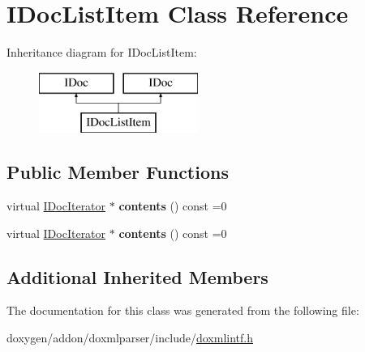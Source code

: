 \hypertarget{class_i_doc_list_item}{}\section{I\+Doc\+List\+Item Class Reference}
\label{class_i_doc_list_item}
Inheritance diagram for I\+Doc\+List\+Item\+:\begin{figure}[H]
\begin{center}
\leavevmode
\includegraphics[height=2.000000cm]{class_i_doc_list_item}
\end{center}
\end{figure}
\subsection*{Public Member Functions}
\begin{DoxyCompactItemize}
\item 
\mbox{\label{class_i_doc_list_item_a1bee48b6e707355087e9286d2e3e1e50}} 
virtual \mbox{\hyperlink{class_i_doc_iterator}{I\+Doc\+Iterator}} $\ast$ {\bfseries contents} () const =0
\item 
\mbox{\label{class_i_doc_list_item_a1bee48b6e707355087e9286d2e3e1e50}} 
virtual \mbox{\hyperlink{class_i_doc_iterator}{I\+Doc\+Iterator}} $\ast$ {\bfseries contents} () const =0
\end{DoxyCompactItemize}
\subsection*{Additional Inherited Members}


The documentation for this class was generated from the following file\+:\begin{DoxyCompactItemize}
\item 
doxygen/addon/doxmlparser/include/\mbox{\hyperlink{include_2doxmlintf_8h}{doxmlintf.\+h}}\end{DoxyCompactItemize}
